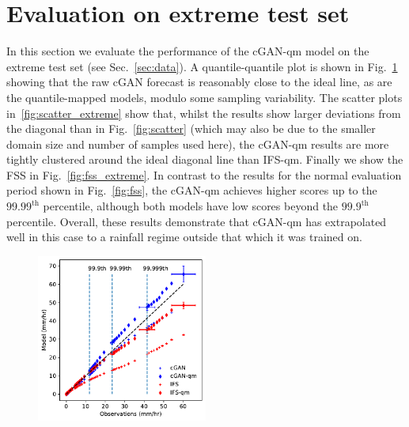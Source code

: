\documentclass{article}
\begin{document}

\section{Evaluation on extreme test set}
\label{sec:eval_extreme}

In this section we evaluate the performance of the cGAN-qm model on the extreme test set (see Sec.~\ref{sec:data}). A quantile-quantile plot is shown in Fig.~\ref{fig:quantiles_extreme} showing that the raw cGAN forecast is reasonably close to the ideal line, as are the quantile-mapped models, modulo some sampling variability. The scatter plots in~\ref{fig:scatter_extreme} show that, whilst the results show larger deviations from the diagonal than in Fig.~\ref{fig:scatter} (which may also be due to the smaller domain size and number of samples used here), the cGAN-qm results are more tightly clustered around the ideal diagonal line than IFS-qm. Finally we show the FSS in Fig.~\ref{fig:fss_extreme}. In contrast to the results for the normal evaluation period shown in Fig.~\ref{fig:fss}, the cGAN-qm achieves higher scores up to the $99.99^{\text{th}}$ percentile, although both models have low scores beyond the $99.9^{\text{th}}$ percentile. Overall, these results demonstrate that cGAN-qm has extrapolated well in this case to a rainfall regime outside that which it was trained on. 





\begin{figure}
     \centering
     \includegraphics[width=0.5\textwidth]{images/q-q_hist_final-nologs-mam2018_217600_kenya.pdf}
     
     \caption{
     }
     \label{fig:quantiles_extreme}
\end{figure}
\end{document}
